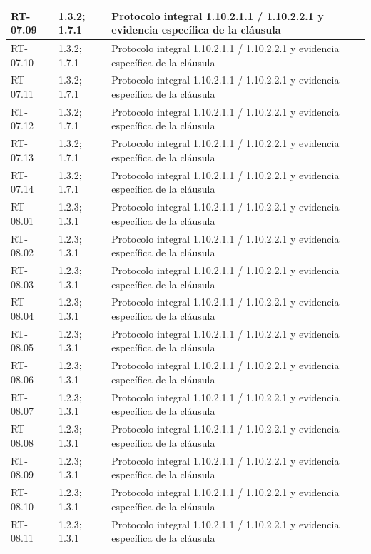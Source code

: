 \begin{longtable}{L{23mm}L{46mm}L{72mm}}
RT-07.09 & 1.3.2; 1.7.1 & Protocolo integral 1.10.2.1.1 / 1.10.2.2.1 y evidencia específica de la cláusula\\\hline
RT-07.10 & 1.3.2; 1.7.1 & Protocolo integral 1.10.2.1.1 / 1.10.2.2.1 y evidencia específica de la cláusula\\\hline
RT-07.11 & 1.3.2; 1.7.1 & Protocolo integral 1.10.2.1.1 / 1.10.2.2.1 y evidencia específica de la cláusula\\\hline
RT-07.12 & 1.3.2; 1.7.1 & Protocolo integral 1.10.2.1.1 / 1.10.2.2.1 y evidencia específica de la cláusula\\\hline
RT-07.13 & 1.3.2; 1.7.1 & Protocolo integral 1.10.2.1.1 / 1.10.2.2.1 y evidencia específica de la cláusula\\\hline
RT-07.14 & 1.3.2; 1.7.1 & Protocolo integral 1.10.2.1.1 / 1.10.2.2.1 y evidencia específica de la cláusula\\\hline
RT-08.01 & 1.2.3; 1.3.1 & Protocolo integral 1.10.2.1.1 / 1.10.2.2.1 y evidencia específica de la cláusula\\\hline
RT-08.02 & 1.2.3; 1.3.1 & Protocolo integral 1.10.2.1.1 / 1.10.2.2.1 y evidencia específica de la cláusula\\\hline
RT-08.03 & 1.2.3; 1.3.1 & Protocolo integral 1.10.2.1.1 / 1.10.2.2.1 y evidencia específica de la cláusula\\\hline
RT-08.04 & 1.2.3; 1.3.1 & Protocolo integral 1.10.2.1.1 / 1.10.2.2.1 y evidencia específica de la cláusula\\\hline
RT-08.05 & 1.2.3; 1.3.1 & Protocolo integral 1.10.2.1.1 / 1.10.2.2.1 y evidencia específica de la cláusula\\\hline
RT-08.06 & 1.2.3; 1.3.1 & Protocolo integral 1.10.2.1.1 / 1.10.2.2.1 y evidencia específica de la cláusula\\\hline
RT-08.07 & 1.2.3; 1.3.1 & Protocolo integral 1.10.2.1.1 / 1.10.2.2.1 y evidencia específica de la cláusula\\\hline
RT-08.08 & 1.2.3; 1.3.1 & Protocolo integral 1.10.2.1.1 / 1.10.2.2.1 y evidencia específica de la cláusula\\\hline
RT-08.09 & 1.2.3; 1.3.1 & Protocolo integral 1.10.2.1.1 / 1.10.2.2.1 y evidencia específica de la cláusula\\\hline
RT-08.10 & 1.2.3; 1.3.1 & Protocolo integral 1.10.2.1.1 / 1.10.2.2.1 y evidencia específica de la cláusula\\\hline
RT-08.11 & 1.2.3; 1.3.1 & Protocolo integral 1.10.2.1.1 / 1.10.2.2.1 y evidencia específica de la cláusula\\\hline

\end{longtable}
